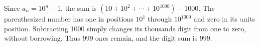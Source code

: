 Since $a_n=10^n-1$, the sum is $(10+10^2+\cdots+10^{1000})-1000$. The parenthesized number has one in positions $10^1$ through $10^{1000}$ and zero in its units position. Subtracting 1000 simply changes its thousands digit from one to zero, without borrowing. Thus 999 ones remain, and the digit sum is $\boxed{999}$.
